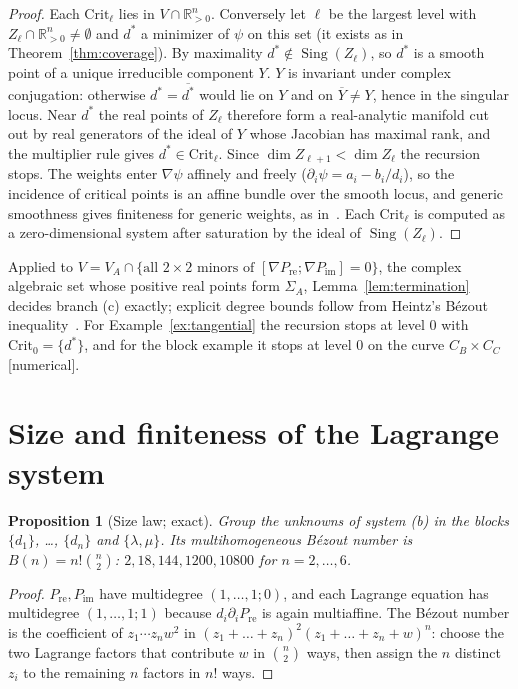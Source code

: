 \documentclass[11pt,a4paper]{article}
\theoremstyle{plain}
\newtheorem{proposition}[theorem]{Proposition}
\theoremstyle{definition}
\newcommand{\R}{\mathbb{R}}
\newcommand{\Rp}{\R^n_{>0}}
\newcommand{\Pre}{P_{\mathrm{re}}}
\newcommand{\Pim}{P_{\mathrm{im}}}
\begin{document}
\begin{proof}
Each $\mathrm{Crit}_\ell$ lies in $V\cap\Rp$. Conversely let $\ell$ be the largest level with
$Z_\ell\cap\Rp\neq\emptyset$ and $d^{*}$ a minimizer of $\psi$ on this set (it exists as in
Theorem~\ref{thm:coverage}). By maximality $d^{*}\notin\operatorname{Sing}(Z_\ell)$, so $d^{*}$ is a smooth point
of a unique irreducible component $Y$. $Y$ is invariant under complex conjugation: otherwise
$d^{*}=\overline{d^{*}}$ would lie on $Y$ and on $\overline Y\neq Y$, hence in the singular locus. Near $d^{*}$ the
real points of $Z_\ell$ therefore form a real-analytic manifold cut out by real generators of the ideal of $Y$ whose
Jacobian has maximal rank, and the multiplier rule gives $d^{*}\in\mathrm{Crit}_\ell$. Since
$\dim Z_{\ell+1}<\dim Z_\ell$ the recursion stops. The weights enter $\nabla\psi$ affinely and freely
($\partial_i\psi=a_i-b_i/d_i$), so the incidence of critical points is an affine bundle over the smooth locus, and
generic smoothness gives finiteness for generic weights, as
in~\cite{AubryRouillierSafeyElDin2002,SafeyElDinSchost2003,BasuPollackRoy2006}. Each $\mathrm{Crit}_\ell$ is computed
as a zero-dimensional system after saturation by the ideal of $\operatorname{Sing}(Z_\ell)$.
\end{proof}

Applied to $V=V_A\cap\{\text{all }2\times2\text{ minors of }[\nabla\Pre;\nabla\Pim]=0\}$, the complex algebraic set
whose positive real points form $\Sigma_A$, Lemma~\ref{lem:termination} decides branch (c) exactly; explicit degree
bounds follow from Heintz's B\'ezout inequality~\cite{Heintz1983}. For Example~\ref{ex:tangential} the recursion
stops at level $0$ with $\mathrm{Crit}_0=\{d^{*}\}$, and for the block example it stops at level $0$ on the curve
$C_B\times C_C$ [numerical].

\section{Size and finiteness of the Lagrange system}\label{sec:size}

\begin{proposition}[Size law; exact]\label{prop:bezout}
Group the unknowns of system (b) in the blocks $\{d_1\}$, \dots, $\{d_n\}$ and $\{\lambda,\mu\}$. Its multihomogeneous
B\'ezout number
is $B(n)=n!\binom n2$: $2,18,144,1200,10800$ for $n=2,\dots,6$.
\end{proposition}

\begin{proof}
$\Pre,\Pim$ have multidegree $(1,\dots,1;0)$, and each Lagrange equation has multidegree $(1,\dots,1;1)$ because
$d_i\partial_i\Pre$ is again multiaffine. The B\'ezout number is the coefficient of $z_1\cdots z_nw^2$ in
$(z_1+\dots+z_n)^2(z_1+\dots+z_n+w)^n$: choose the two Lagrange factors that contribute $w$ in $\binom n2$ ways,
then assign the $n$ distinct $z_i$ to the remaining $n$ factors in $n!$ ways.
\end{proof}
\end{document}
